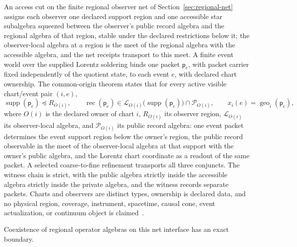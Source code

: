 \documentclass[11pt]{article}
\begin{document}
An access cut on the finite regional observer net of
Section~\ref{sec:regional-net} assigns each
observer one declared support region and one accessible star subalgebra
squeezed between the observer's public record algebra and the regional
algebra of that region, stable under the declared restrictions below it;
the observer-local algebra at a region is the meet of the regional algebra
with the accessible algebra, and the net receipts transport to this meet.
A finite event world over the supplied Lorentz soldering binds one packet
\(\mathsf p_e\), with packet carrier fixed independently of the quotient
state, to each event \(e\), with declared chart ownership. The
common-origin theorem states that for every active visible chart/event
pair \((i,e)\),
\[
\operatorname{supp}(\mathsf p_e)\preceq R_{O(i)},\qquad
\operatorname{rec}(\mathsf p_e)\in
\mathcal L_{O(i)}\!\bigl(\operatorname{supp}(\mathsf p_e)\bigr)\cap
\mathcal P_{O(i)},\qquad
x_i(e)=\operatorname{geo}_i(\mathsf p_e),
\]
where \(O(i)\) is the declared owner of chart \(i\), \(R_{O(i)}\) its
observer region, \(\mathcal L_{O(i)}\) its observer-local algebra, and
\(\mathcal P_{O(i)}\) its public record algebra: one event packet
determines the event support region below the owner's region, the public
record observable in the meet of the observer-local algebra at that
support with the owner's public algebra, and the Lorentz chart coordinate
as a readout of the same packet. A selected coarse-to-fine refinement
transports all three conjuncts. The witness chain is strict, with the
public algebra strictly inside the accessible algebra strictly inside the
private algebra, and the witness records separate packets. Charts and
observers are distinct types, ownership is declared data, and no physical
region, coverage, instrument, spacetime, causal cone, event actualization,
or continuum object is claimed~\cite{ophrepo}.

Coexistence of regional operator algebras on this net interface has an
exact boundary.
\end{document}
